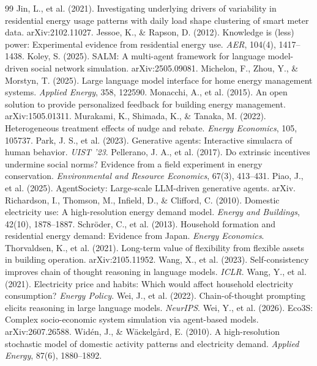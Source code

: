 \documentclass[11pt]{article}
\begin{document}
\begin{thebibliography}{99}
 Jin, L., et al. (2021). Investigating underlying drivers of variability in residential energy usage patterns with daily load shape clustering of smart meter data. arXiv:2102.11027.
 Jessoe, K., \& Rapson, D. (2012). Knowledge is (less) power: Experimental evidence from residential energy use. \emph{AER}, 104(4), 1417--1438.
 Koley, S. (2025). SALM: A multi-agent framework for language model-driven social network simulation. arXiv:2505.09081.
 Michelon, F., Zhou, Y., \& Morstyn, T. (2025). Large language model interface for home energy management systems. \emph{Applied Energy}, 358, 122590.
 Monacchi, A., et al. (2015). An open solution to provide personalized feedback for building energy management. arXiv:1505.01311.
 Murakami, K., Shimada, K., \& Tanaka, M. (2022). Heterogeneous treatment effects of nudge and rebate. \emph{Energy Economics}, 105, 105737.
 Park, J. S., et al. (2023). Generative agents: Interactive simulacra of human behavior. \emph{UIST '23}.
 Pellerano, J. A., et al. (2017). Do extrinsic incentives undermine social norms? Evidence from a field experiment in energy conservation. \emph{Environmental and Resource Economics}, 67(3), 413--431.
 Piao, J., et al. (2025). AgentSociety: Large-scale LLM-driven generative agents. arXiv.
 Richardson, I., Thomson, M., Infield, D., \& Clifford, C. (2010). Domestic electricity use: A high-resolution energy demand model. \emph{Energy and Buildings}, 42(10), 1878--1887.
 Schr\"oder, C., et al. (2013). Household formation and residential energy demand: Evidence from Japan. \emph{Energy Economics}.
 Thorvaldsen, K., et al. (2021). Long-term value of flexibility from flexible assets in building operation. arXiv:2105.11952.
 Wang, X., et al. (2023). Self-consistency improves chain of thought reasoning in language models. \emph{ICLR}.
 Wang, Y., et al. (2021). Electricity price and habits: Which would affect household electricity consumption? \emph{Energy Policy}.
 Wei, J., et al. (2022). Chain-of-thought prompting elicits reasoning in large language models. \emph{NeurIPS}.
 Wei, Y., et al. (2026). Eco3S: Complex socio-economic system simulation via agent-based models. arXiv:2607.26588.
 Wid\'en, J., \& W\"ackelg\r{a}rd, E. (2010). A high-resolution stochastic model of domestic activity patterns and electricity demand. \emph{Applied Energy}, 87(6), 1880--1892.

\end{thebibliography}
\end{document}
